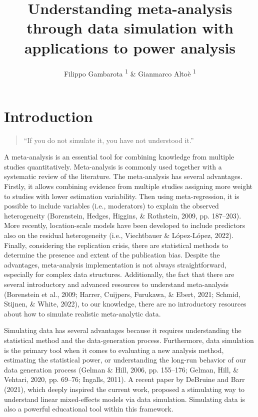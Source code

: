 \documentclass[
  man,floatsintext]{apa6}
\title{Understanding meta-analysis through data simulation with applications to power analysis}
\author{Filippo Gambarota \orcidlink{0000-0002-6666-1747}\textsuperscript{1} \& Gianmarco Altoè \orcidlink{0000-0003-1154-9528}\textsuperscript{1}}
\date{}
\affiliation{\vspace{0.5cm}\textsuperscript{1} Department of Developmental and Social Psychology, University of Padova, Italy}
\begin{document}
\maketitle

\setcounter{secnumdepth}{5}

\hypertarget{introduction}{%
\section{Introduction}\label{introduction}}

\begin{quote}
``If you do not simulate it, you have not understood it.''
\end{quote}

A meta-analysis is an essential tool for combining knowledge from multiple studies quantitatively. Meta-analysis is commonly used together with a systematic review of the literature. The meta-analysis has several advantages. Firstly, it allows combining evidence from multiple studies assigning more weight to studies with lower estimation variability. Then using meta-regression, it is possible to include variables (i.e., moderators) to explain the observed heterogeneity (Borenstein, Hedges, Higgins, \& Rothstein, 2009, pp. 187--203). More recently, location-scale models have been developed to include predictors also on the residual heterogeneity (i.e., Viechtbauer \& López-López, 2022). Finally, considering the replication crisis, there are statistical methods to determine the presence and extent of the publication bias. Despite the advantages, meta-analysis implementation is not always straightforward, especially for complex data structures. Additionally, the fact that there are several introductory and advanced resources to understand meta-analysis (Borenstein et al., 2009; Harrer, Cuijpers, Furukawa, \& Ebert, 2021; Schmid, Stijnen, \& White, 2022), to our knowledge, there are no introductory resources about how to simulate realistic meta-analytic data.

Simulating data has several advantages because it requires understanding the statistical method and the data-generation process. Furthermore, data simulation is the primary tool when it comes to evaluating a new analysis method, estimating the statistical power, or understanding the long-run behavior of our data generation process (Gelman \& Hill, 2006, pp. 155--176; Gelman, Hill, \& Vehtari, 2020, pp. 69--76; Ingalls, 2011). A recent paper by DeBruine and Barr (2021), which deeply inspired the current work, proposed a stimulating way to understand linear mixed-effects models via data simulation. Simulating data is also a powerful educational tool within this framework.
\end{document}
